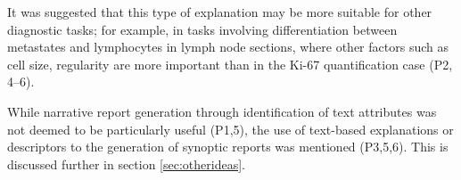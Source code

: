 It was suggested that this type of explanation may be more suitable for other diagnostic tasks; for example, in tasks involving differentiation between metastates and lymphocytes in lymph node sections, where other factors such as cell size, regularity are more important than in the Ki-67 quantification case (P2, 4--6).


While narrative report generation through identification of text attributes was not deemed to be particularly useful (P1,5), the use of text-based explanations or descriptors to the generation of synoptic reports was mentioned (P3,5,6). This is discussed further in section \ref{sec:otherideas}. %

